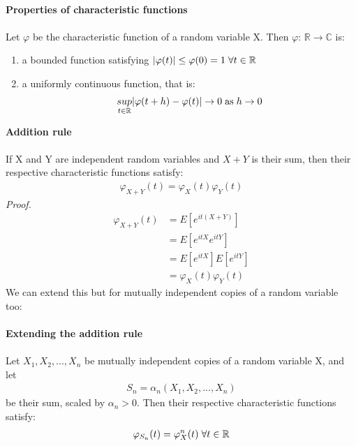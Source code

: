 \documentclass[,oneside]{article}
\begin{document}
\begin{enumerate}
\begin{align*}
\end{align*}
\textbf{Properties of characteristic functions}\\ \\
Let $\varphi$ be the characteristic function of a random variable X. Then $\varphi$: $\mathbb{R} \to \mathbb{C}$ is:
\begin{enumerate}
\item a bounded function satisfying $|\varphi (t)| \leq \varphi (0) = 1 \hspace{0.1cm} \forall t \in \mathbb{R}$
\item a uniformly continuous function, that is:\\
\begin{align*}
\underset{t \in \mathbb{R}}{sup}|\varphi(t+h)-\varphi(t)| \rightarrow 0\hspace{0.1cm} \text{as} \hspace{0.1cm} h \rightarrow 0
\end{align*} 
\end{enumerate}
\textbf{Addition rule}\\ \\
If X and Y are independent random variables and $X+Y$ is their sum, then their respective characteristic functions satisfy:
\begin{align*}
\varphi_{X+Y}(t)=\varphi_X(t)\varphi_Y(t)
\end{align*}
\textit{Proof.}
\begin{align*}
\varphi_{X+Y}(t)&=E[e^{it(X+Y)}]\\
&= E[e^{itX}e^{itY}]\\
&=E[e^{itX}]E[e^{itY}]\\
&=\varphi_X(t)\varphi_Y(t)
\end{align*}
We can extend this but for mutually independent copies of a random variable too:\\ \\
\textbf{Extending the addition rule}\\ \\
Let $X_1, X_2,...,X_n$ be mutually independent copies of a random variable X, and let
\begin{align*}
S_n = \alpha_n(X_1, X_2,...,X_n)
\end{align*}
be their sum, scaled by $\alpha_n > 0$. Then their respective characteristic functions satisfy:
\begin{align*}
\varphi_{S_n}(t)=\varphi_X^n(t) \hspace{0.1cm} \forall t \in \mathbb{R}\\

\end{align*}
\end{enumerate}
\end{document}
